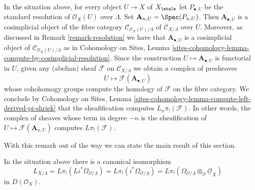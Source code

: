 \begin{remark}
\label{remark-compute-L-pi-shriek-spaces}
In the situation above, for every object $U \to X$ of $X_\etale$
let $P_{\bullet, U}$ be the standard resolution of $\mathcal{O}_X(U)$
over $\Lambda$. Set $\mathbf{A}_{n, U} = \Spec(P_{n, U})$.
Then $\mathbf{A}_{\bullet, U}$
is a cosimplicial object of the fibre category
$\mathcal{C}_{\mathcal{O}_X(U)/\Lambda}$ of
$\mathcal{C}_{X/\Lambda}$ over $U$. Moreover, as discussed
in Remark \ref{remark-resolution} we have that $\mathbf{A}_{\bullet, U}$
is a cosimplicial object of $\mathcal{C}_{\mathcal{O}_X(U)/\Lambda}$
as in Cohomology on Sites, Lemma
\ref{sites-cohomology-lemma-compute-by-cosimplicial-resolution}.
Since the construction $U \mapsto \mathbf{A}_{\bullet, U}$ is functorial
in $U$, given any (abelian) sheaf $\mathcal{F}$ on $\mathcal{C}_{X/\Lambda}$
we obtain a complex of presheaves
$$
U \longmapsto \mathcal{F}(\mathbf{A}_{\bullet, U})
$$
whose cohohomogy groups compute the homology of $\mathcal{F}$ on the fibre
category. We conclude by
Cohomology on Sites, Lemma
\ref{sites-cohomology-lemma-compute-left-derived-pi-shriek}
that the sheafification computes $L_n\pi_!(\mathcal{F})$.
In other words, the complex of sheaves whose term in degree $-n$ is
the sheafification of $U \mapsto \mathcal{F}(\mathbf{A}_{n, U})$ computes
$L\pi_!(\mathcal{F})$.
\end{remark}

\noindent
With this remark out of the way we can state the main
result of this section.

\begin{lemma}
\label{lemma-cotangent-morphism-spaces}
In the situation above there is a canonical isomorphism
$$
L_{X/\Lambda} = 
L\pi_!(Li^*\Omega_{\mathcal{O}/\underline{\Lambda}}) =
L\pi_!(i^*\Omega_{\mathcal{O}/\underline{\Lambda}}) =
L\pi_!(\Omega_{\mathcal{O}/\underline{\Lambda}}
\otimes_\mathcal{O} \underline{\mathcal{O}}_X)
$$
in $D(\mathcal{O}_X)$.
\end{lemma}

